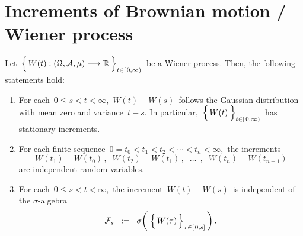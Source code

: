 

\section{Increments of Brownian motion / Wiener process}
\setcounter{theorem}{0}
\setcounter{equation}{0}


\renewcommand{\theenumi}{\roman{enumi}}
\renewcommand{\labelenumi}{\textnormal{(\theenumi)}$\;\;$}


\begin{proposition}
\label{WienerProcessIncrements}
\mbox{}
\vskip 0.2cm
\noindent
Let
\,$\left\{\,\overset{{\color{white}.}}{W}(t) : (\Omega,\mathcal{A},\mu) \longrightarrow \Re \;\right\}_{t \in[\,0,\infty)}$\,
be a Wiener process.
Then, the following statements hold:
\begin{enumerate}
\item
	For each \,$0 \leq s < t < \infty$,
	\,$W(t) - W(s)$\, follows the Gaussian distribution with mean zero and variance \,$t-s$.
	In particular,
	\,$\left\{\,\overset{{\color{white}.}}{W}(t)\;\right\}_{t \in[\,0,\infty)}$\,
	has stationary increments.
\item
	For each finite sequence \,$0 = t_{0} < t_{1} < t_{2} < \cdots < t_{n} < \infty$,\,
	the increments
	\begin{equation*}
	W(t_{1}) - W(t_{0})\,,\;\;
	W(t_{2}) - W(t_{1})\,,\;\;
	\ldots\;\,,\;\;
	W(t_{n}) - W(t_{n-1})
	\end{equation*}
	are independent random variables.
\item
	For each \,$0 \leq s < t < \infty$,\,
	the increment \,$W(t) - W(s)$\,
	is independent of the $\sigma$-algebra
	\begin{equation*}
	\mathcal{F}_{s}
	\;\; := \;\;
		\sigma\!\left(\;\left\{\,
			\overset{{\color{white}.}}{W}(\tau)
			\,\right\}_{\tau \in [\,0,s]}\,\right).
	\end{equation*}
\end{enumerate}
\end{proposition}
\proof
